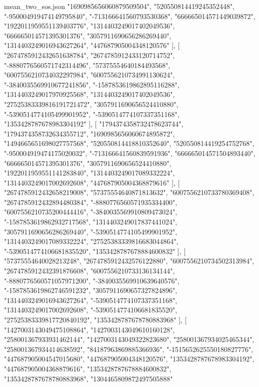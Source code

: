\begin{filecontents*}[overwrite]{mean_two_sos.json}
    "1690985656060879509504",
    "520550814419245352448",
    "-950004919474149795840",
    "-713166641560793530368",
    "666665014571449039872",
    "1922011959551139403776",
    "1314403249017402049536",
    "666665014571395301376",
    "3057911690656286269440",
    "1314403249016943627264",
    "447687905004348120576"
   ],
   [
    "2674785912432651638784",
    "2674785912433120714752",
    "-8880776560571742314496",
    "57375554640184493568",
    "6007556210734032297984",
    "6007556210734991130624",
    "-3840035569910677241856",
    "-1587853619862895116288",
    "1314403249017970925568",
    "1314403249017402049536",
    "27525383339816191721472",
    "3057911690656524410880",
    "-5390514774105499901952",
    "-5390514774107337351168",
    "1353428787678983304192"
   ],
   [
    "1794374358732478623744",
    "1794374358732634355712",
    "1690985656060674895872",
    "1494665651698027757568",
    "520550814418810352640",
    "520550814419254752768",
    "-950004919474175020032",
    "-713166641560839591936",
    "666665014571504893440",
    "666665014571395301376",
    "3057911690656524410880",
    "1922011959551141283840",
    "1314403249017089332224",
    "1314403249017002692608",
    "447687905004368879616"
   ],
   [
    "2674785912432658219008",
    "57375554640871813632",
    "6007556210733780369408",
    "2674785912432894480384",
    "-8880776560571935334400",
    "6007556210735200444416",
    "-3840035569910809473024",
    "-1587853619862932717568",
    "1314403249017837441024",
    "3057911690656286269440",
    "-5390514774105499901952",
    "1314403249017089332224",
    "27525383339816683044864",
    "-5390514774106681835520",
    "1353428787678884600832"
   ],
   [
    "57375554640028213248",
    "2674785912432576122880",
    "6007556210734502313984",
    "2674785912432391876608",
    "6007556210733136134144",
    "-8880776560571057971200",
    "-3840035569910639640576",
    "-1587853619862746591232",
    "3057911690657327824896",
    "1314403249016943627264",
    "-5390514774107337351168",
    "1314403249017002692608",
    "-5390514774106681835520",
    "27525383339817720840192",
    "1353428787678780883968"
   ],
   [
    "1427003143049475108864",
    "1427003143049610160128",
    "258001367933931462144",
    "1427003143049322823680",
    "258001367934025465344",
    "258001367934414638592",
    "84187963869885366936",
    "-1515652625550180827776",
    "447687905004547015680",
    "447687905004348120576",
    "1353428787678983304192",
    "447687905004368879616",
    "1353428787678884600832",
    "1353428787678780883968",
    "1304465809872497505888"

\end{filecontents*}
